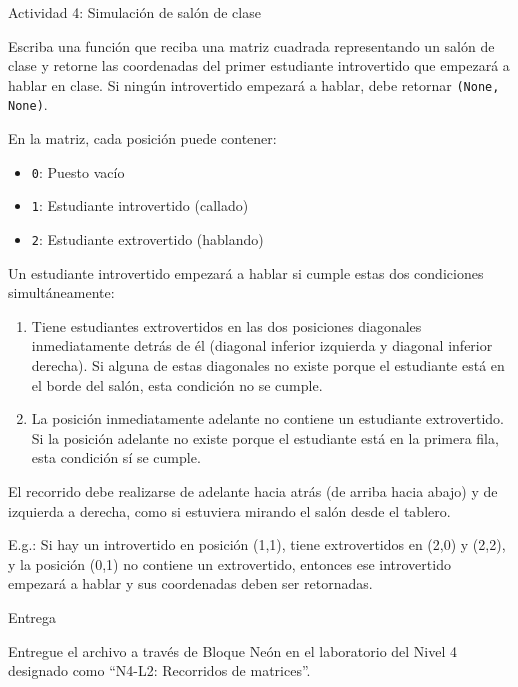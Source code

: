 \documentclass{ip-lab}
\begin{document}
\begin{sectionbox}{Actividad 4: Simulación de salón de clase}

Escriba una función que reciba una matriz cuadrada representando un salón de clase y retorne las coordenadas del primer estudiante introvertido que empezará a hablar en clase. Si ningún introvertido empezará a hablar, debe retornar \texttt{(None, None)}.

En la matriz, cada posición puede contener:
\begin{itemize}
    \item \texttt{0}: Puesto vacío
    \item \texttt{1}: Estudiante introvertido (callado)
    \item \texttt{2}: Estudiante extrovertido (hablando)
\end{itemize}

Un estudiante introvertido empezará a hablar si cumple estas dos condiciones simultáneamente:
\begin{enumerate}
    \item Tiene estudiantes extrovertidos en las dos posiciones diagonales inmediatamente detrás de él (diagonal inferior izquierda y diagonal inferior derecha). Si alguna de estas diagonales no existe porque el estudiante está en el borde del salón, esta condición no se cumple.
    \item La posición inmediatamente adelante no contiene un estudiante extrovertido. Si la posición adelante no existe porque el estudiante está en la primera fila, esta condición sí se cumple.
\end{enumerate}

El recorrido debe realizarse de adelante hacia atrás (de arriba hacia abajo) y de izquierda a derecha, como si estuviera mirando el salón desde el tablero.

E.g.: Si hay un introvertido en posición (1,1), tiene extrovertidos en (2,0) y (2,2), y la posición (0,1) no contiene un extrovertido, entonces ese introvertido empezará a hablar y sus coordenadas deben ser retornadas.

\end{sectionbox}


\begin{sectionbox}{Entrega}

Entregue el archivo a través de Bloque Neón en el laboratorio del Nivel 4 designado como ``N4-L2: Recorridos de matrices''.
\end{sectionbox}
\end{document}
